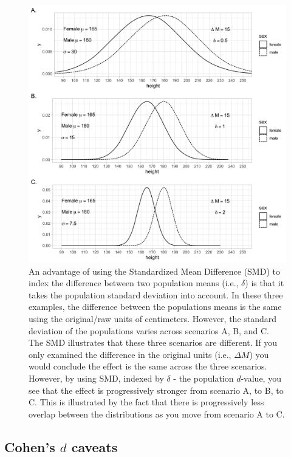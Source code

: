 \documentclass[
]{krantz}
\begin{document}
\begin{figure}
\includegraphics[width=1\linewidth]{ch_populations/images/dvalue_ex2} \caption[Advantages of standadized mean difference]{An advantage of using the Standardized Mean Difference (SMD) to index the difference between two population means (i.e., $\delta$) is that it takes the population standard deviation into account. In these three examples, the difference between the populations means is the same using the original/raw units of centimeters. However, the standard deviation of the populations varies across scenarios A, B, and C. The SMD illustrates that these three scenarios are different. If you only examined the difference in the original units (i.e., $\Delta M$) you would conclude the effect is the same across the three scenarios. However, by using SMD, indexed by $\delta$ - the population $d$-value, you see that the effect is progressively stronger from scenario A, to B, to C. This is illustrated by the fact that there is progressively less overlap between the distributions as you move from scenario A to C.}\label{fig:dex2}
\end{figure}

\hypertarget{cohens-d-caveats}{%
\subsection{\texorpdfstring{Cohen's \(d\) caveats}{Cohen's d caveats}}\label{cohens-d-caveats}}
\end{document}
